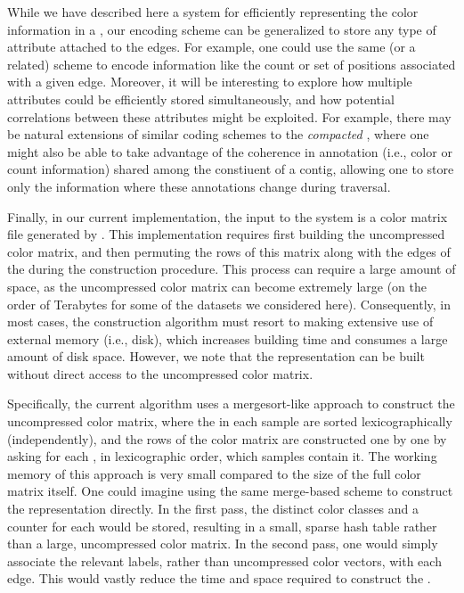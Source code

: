 While we have described here a system for efficiently representing the color
information in a \cdbg, our encoding scheme can be generalized to store any type
of attribute attached to the edges. For example, one could use the same (or a
related) scheme to encode information like the \kmer count or set of positions
associated with a given edge. Moreover, it will be interesting to explore how
multiple attributes could be efficiently stored simultaneously, and how
potential correlations between these attributes might be exploited. For example,
there may be natural extensions of similar coding schemes to the
\emph{compacted} \dbg, where one might also be able to take advantage of the
coherence in annotation (i.e., color or count information) shared among the
constiuent \kmers of a contig, allowing one to store only the information where
these annotations change during traversal.

Finally, in our current implementation, the input to the system is a color
matrix file generated by \vari. This implementation requires first building the
uncompressed color matrix, and then permuting the rows of this matrix along with
the edges of the \dbg during the \boss construction procedure. 
%
%
%
This process can require a large amount of space, as the uncompressed color
matrix can become extremely large (on the order of Terabytes for some of the
datasets we considered here). Consequently, in most cases, the construction
algorithm must resort to making extensive use of external memory (i.e., disk),
which increases building time and consumes a large amount of disk space.
However, we note that the \system representation can be built without direct
access to the uncompressed color matrix.

Specifically, the current \vari algorithm uses a mergesort-like approach to
construct the uncompressed color matrix, where the \kmers in each sample are
sorted lexicographically (independently), and the rows of the color matrix are
constructed one by one by asking for each \kmer, in lexicographic order, which
samples contain it. The working memory of this approach is very small compared
to the size of the full color matrix itself. One could imagine using the same
merge-based scheme to construct the \system representation directly. In the
first pass, the distinct color classes and a counter for each would be stored,
resulting in a small, sparse hash table rather than a large, uncompressed color
matrix. In the second pass, one would simply associate the relevant
labels, rather than uncompressed color vectors, with each edge. This would
vastly reduce the time and space required to construct the \cdbg.

